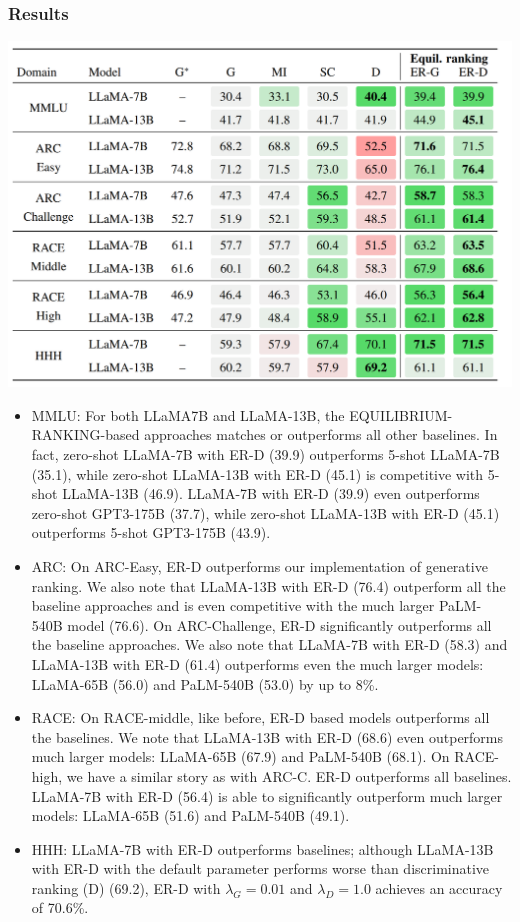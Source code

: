 \documentclass[12pt]{article}
\begin{document}
\subsubsection*{Results}
\begin{center}
  \includegraphics*[scale = 0.5]{table15.png}
\end{center}
\begin{itemize}
  \item MMLU: For both LLaMA7B and LLaMA-13B, the EQUILIBRIUM-RANKING-based approaches matches or outperforms all
  other baselines. In fact, zero-shot LLaMA-7B with ER-D (39.9) outperforms 5-shot LLaMA-7B
  (35.1), while zero-shot LLaMA-13B with ER-D (45.1) is competitive with 5-shot LLaMA-13B
  (46.9). LLaMA-7B with ER-D (39.9) even outperforms zero-shot GPT3-175B (37.7), while zero-shot LLaMA-13B with ER-D (45.1) outperforms 5-shot GPT3-175B (43.9).
  \item ARC: On ARC-Easy, ER-D outperforms our implementation of generative ranking. We also note that
  LLaMA-13B with ER-D (76.4) outperform all the baseline approaches and is even competitive with
  the much larger PaLM-540B model (76.6). On ARC-Challenge, ER-D
  significantly outperforms all the baseline approaches. We also note that LLaMA-7B with ER-D (58.3)
  and LLaMA-13B with ER-D (61.4) outperforms even the much larger models: LLaMA-65B (56.0) and PaLM-540B (53.0) by up to 8\%.
  \item RACE: On RACE-middle, like before, ER-D based
  models outperforms all the baselines. We note that LLaMA-13B with ER-D (68.6) even outperforms
  much larger models: LLaMA-65B (67.9) and PaLM-540B (68.1). On RACE-high, we have a similar story as with ARC-C. ER-D outperforms all baselines.
  LLaMA-7B with ER-D (56.4) is able to significantly outperform much larger models: LLaMA-65B
  (51.6) and PaLM-540B (49.1).
  \item HHH: LLaMA-7B with ER-D outperforms baselines; although LLaMA-13B with
  ER-D with the default parameter performs worse than discriminative ranking (D) (69.2), ER-D with
  $\lambda_G = 0.01$ and $\lambda_D = 1.0$ achieves an accuracy of 70.6\%.
\end{itemize}
\end{document}
